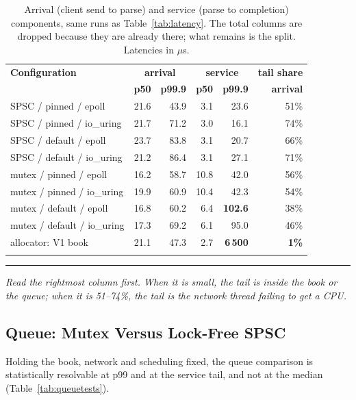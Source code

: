 \documentclass[conference]{IEEEtran}
\newcommand{\reading}[1]{%
  \par\vspace{1pt}\noindent
  \textcolor{corange}{\rule[-0.2ex]{2.2pt}{1.05em}}\hspace{3pt}%
  \textit{\textcolor{cgray}{#1}}\par\vspace{2pt}}
\begin{document}
\begin{table}[!t]
\centering
\caption{Arrival (client send to parse) and service (parse to completion)
components, same runs as Table~\ref{tab:latency}. The total columns are dropped
because they are already there; what remains is the split. Latencies in
$\mu$s.}
\label{tab:decomposition}
\small
\setlength{\tabcolsep}{7pt}
\begin{tabular}{@{}lrrrrr@{}}
\arrayrulecolor{cblue}\toprule
\rowcolor{cblueL}\textbf{Configuration} &
  \multicolumn{2}{c}{\cellcolor{cblue!22}\textbf{arrival}} &
  \multicolumn{2}{c}{\cellcolor{corange!22}\textbf{service}} &
  \cellcolor{cgreen!22}\textbf{tail share} \\
\rowcolor{cblueL}\textbf{} & \textbf{p50} & \textbf{p99.9} & \textbf{p50} & \textbf{p99.9} & \textbf{arrival} \\
\arrayrulecolor{cblue!45}\midrule
SPSC / pinned / epoll     & 21.6 & 43.9 & 3.1 & 23.6 & 51\% \\
SPSC / pinned / io\_uring & 21.7 & 71.2 & 3.0 & 16.1 & 74\% \\
SPSC / default / epoll    & 23.7 & 83.8 & 3.1 & 20.7 & 66\% \\
SPSC / default / io\_uring& 21.2 & 86.4 & 3.1 & 27.1 & 71\% \\
\arrayrulecolor{corange!45}\midrule
mutex / pinned / epoll    & 16.2 & 58.7 & 10.8 & 42.0 & 56\% \\
mutex / pinned / io\_uring& 19.9 & 60.9 & 10.4 & 42.3 & 54\% \\
mutex / default / epoll   & 16.8 & 60.2 & 6.4 & \textcolor{cred}{\textbf{102.6}} & 38\% \\
mutex / default / io\_uring & 17.3 & 69.2 & 6.1 & 95.0 & 46\% \\
\arrayrulecolor{cgreen!45}\midrule
allocator: V1 book       & 21.1 & 47.3 & 2.7 & \textcolor{cred}{\textbf{6\,500}} & \textcolor{cred}{\textbf{1\%}} \\
\arrayrulecolor{cblue}\bottomrule
\end{tabular}
\end{table}

\reading{Read the rightmost column first. When it is small, the tail is inside
the book or the queue; when it is 51--74\%, the tail is the network thread
failing to get a CPU.}

\subsection{Queue: Mutex Versus Lock-Free SPSC}
Holding the book, network and scheduling fixed, the queue comparison is
statistically resolvable at p99 and at the service tail, and not at the median
(Table~\ref{tab:queuetests}).
\end{document}
